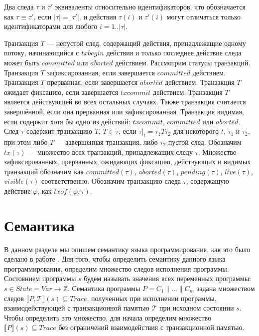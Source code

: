 \begin{mydefinition}\label{def3} Два следа $\tau$ и $\tau'$ эквиваленты относительно идентификаторов, что обозначается как $\tau \equiv \tau'$, если $|\tau| = |\tau'|$, и действия $\tau(i)$ и $\tau'(i)$ могут отличаться только идентификаторами для любого $i = 1..|\tau|$.
\end{mydefinition}

Транзакция $T$ --- непустой след, содержащий действия, принадлежащие одному потоку, начинающийся с $txbegin$ действия и только последнее действие следа может быть $committed$ или $aborted$ действием. Рассмотрим статусы транзакций. Транзакция $T$ зафиксированная, если завершается $committed$ действием. Транзакция $T$ прерванная, если завершается $aborted$ действием. Транзакция $T$ ожидает фиксацию, если завершается $txcommit$ действием. Транзакция $T$ является действующей во всех остальных случаях. Также транзакция считается завершённой, если она прерванная или зафиксированная. Транзакция видимая, если содержит хотя бы одно из действий: $txcommit$, $committed$ или $aborted$. След $\tau$ содержит транзакцию $T$, $T \in \tau$, если $\tau|_t = \tau_1T\tau_2$ для некоторого $t$, $\tau_1$ и $\tau_2$, при этом либо $T$ --- завершённая транзакция, либо $\tau_2$ пустой след. Обозначим $tx(\tau)$ --- множество всех транзакций, принадлежащих следу $\tau$. Множество зафиксированных, прерванных, ожидающих фиксацию, действующих и видимых транзакций обозначим как $committed(\tau)$, $aborted(\tau)$, $pending(\tau)$, $live(\tau)$, $visible(\tau)$ соответственно. Обозначим транзакцию следа $\tau$, содержащую действие $\varphi$, как $txof(\varphi, \tau)$.

\section{Семантика}
В данном разделе мы опишем семантику языка программирования, как это было сделано в работе \cite{tms_article}. Для того, чтобы определить семантику данного языка программирования, определим множество следов исполнения программы. Состоянием программы $s$ будем называть значения всех переменных программы: $s \in State = Var \to \mathbb{Z} $. Семантика программы $P = C_1 \parallel \ldots \parallel C_m$ задана множеством следов $\llbracket P, \mathcal{T} \rrbracket (s) \subseteq Trace$, полученных при исполнении программы, взаимодействующей с транзакционной памятью $\mathcal{T}$ при исходном состоянии $s$. Чтобы определить это множество, для начала определим множество $\llbracket P \rrbracket (s) \subseteq Trace$ без ограничений взаимодействия с транзакционной памятью.

